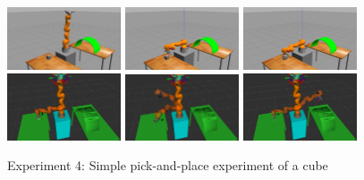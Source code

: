\begin{center}
\begin{figure}[H]
\centering
\includegraphics[width=0.3\textwidth]{images/robot_planner4/robot_planner4_1}
\includegraphics[width=0.3\textwidth]{images/robot_planner4/robot_planner4_3}
\includegraphics[width=0.3\textwidth]{images/robot_planner4/robot_planner4_5}\\
\includegraphics[width=0.3\textwidth]{images/robot_planner4/robot_planner4_6}
\includegraphics[width=0.3\textwidth]{images/robot_planner4/robot_planner4_8}
\includegraphics[width=0.3\textwidth]{images/robot_planner4/robot_planner4_10}\\
\caption{Experiment 4: Simple pick-and-place experiment of a cube}
\end{figure}
\end{center}

